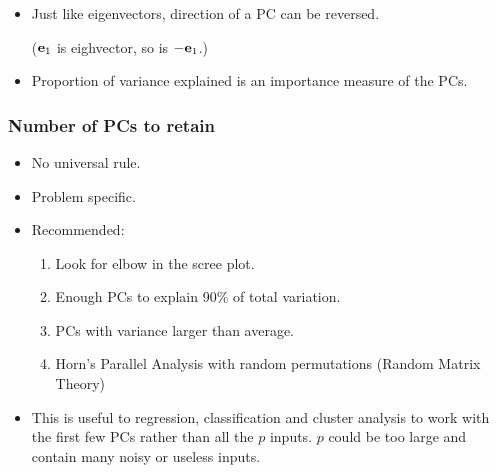 \documentclass{beamer}
\begin{document}
   
   
   \begin{frame}
   	\frametitle{  }
   	\begin{itemize}
   		\item Just like eigenvectors,   direction of a PC can be reversed.
   		
   		(${\bf e}_1$ is eighvector, so is $-{\bf e}_1$.)  
   		
   		\item Proportion of variance explained is an importance measure of the PCs.
   		
   	 
   	\end{itemize}
   \end{frame}      
         
           
            	 
            		
             
         
         
          \begin{frame}
          	\frametitle{  Number of PCs to retain}
          	\begin{itemize}
          		\item  No universal rule.
          		\item  Problem specific.
          		 \item Recommended:
          		 \begin{enumerate}
          		 \item Look for elbow in the scree plot.
          			\item Enough PCs to explain 90\% of total variation.
          			\item PCs with variance larger than average.
				\item Horn's Parallel Analysis with random permutations (Random Matrix Theory)
          		\end{enumerate}
          		\item This is useful to regression, classification and cluster analysis 
          		to work with the first few PCs rather than all the $p$ 
          		inputs. $p$ could   be  too large and contain many noisy or useless inputs.
          	 
          		
          	\end{itemize}
          \end{frame}    
                  
\end{document}
